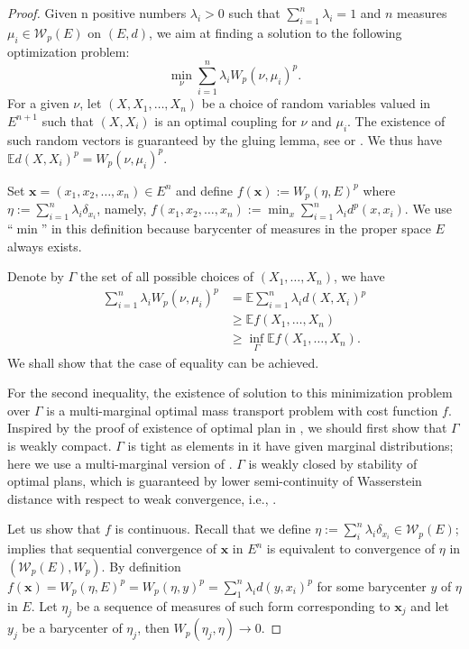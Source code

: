 \begin{proof}
	Given n positive numbers $\lambda_i > 0$ such that $\sum_{i=1}^n \lambda_i = 1$
	and $n$ measures $\mu_i \in \mathcal{W}_p(E)$ on $(E,d)$,
	we aim at finding a solution to the following optimization problem:
	\[
		\min_{\nu} \sum_{i=1}^{n}\lambda_i W_p(\nu, \mu_i)^p.
	\]
	For a given $\nu$, let $(X, X_1,\ldots,X_n)$ be a choice of random variables
	valued in $E^{n+1}$ such that
	$(X,X_i)$ is an optimal coupling for $\nu$ and $\mu_i$.
	The existence of such random vectors is guaranteed by the gluing lemma,
	see \cite[Lemma 7.6]{villani2003topics} or \cite[Lemma 5.3.4]{ambrosio2005gradient}.
	We thus have $\mathbb{E}d(X,X_i)^p = W_p(\nu, \mu_i)^p$.

	Set $\boldsymbol{x}=(x_1, x_2, \ldots, x_n) \in E^n$ and define $f(\boldsymbol{x}):= W_p(\eta, E)^p$
	where $\eta := \sum_{i=1}^{n} \lambda_i \delta_{x_i}$,
	namely, $f(x_1, x_2, \ldots, x_n) := \min_{x} \sum_{i=1}^n \lambda_i d^p(x, x_i)$.
	We use ``$\min$'' in this definition because barycenter of measures in the proper space $E$ always exists.

	Denote by $\Gamma$ the set of all possible choices of $(X_1, \ldots, X_n)$, we have
	\begin{align*}
		\sum_{i=1}^{n}\lambda_i W_p(\nu, \mu_i)^p & = \mathbb{E} \sum_{i=1}^{n}\lambda_i d(X,X_i)^p  \\
		                                          & \geq \mathbb{E} f(X_1, \ldots, X_n)              \\
		                                          & \geq \inf_\Gamma \mathbb{E} f(X_1, \ldots, X_n).
	\end{align*}
	We shall show that the case of equality can be achieved.

	For the second inequality, the existence of solution to this minimization problem over $\Gamma$
	is a multi-marginal optimal mass transport problem with cost function $f$.
	Inspired by the proof of existence of optimal plan in ,
	we should first show that $\Gamma$ is weakly compact.
	$\Gamma$ is tight as elements in it have given marginal distributions;
	here we use a multi-marginal version of .
	$\Gamma$ is weakly closed by stability of optimal plans,
	which is guaranteed by lower semi-continuity of
	Wasserstein distance with respect to weak convergence,
	i.e., .

	Let us show that $f$ is continuous.
	Recall that we define $\eta := \sum_i^{n}\lambda_i \delta_{x_i} \in \mathcal{W}_p(E)$;
	 implies that
	sequential convergence of $\boldsymbol{x}$ in $E^n$
	is equivalent to convergence of $\eta$ in $(\mathcal{W}_p(E), W_p)$.
	By definition $f(\boldsymbol{x}) = W_p(\eta, E)^p=W_p(\eta, y)^p = \sum_{1}^{n} \lambda_i d(y, x_i)^p$
	for some barycenter $y$ of $\eta$ in $E$.
	Let $\eta_j$ be a sequence of measures of such form corresponding to $\boldsymbol{x}_j$ and
	let $y_j$ be a barycenter of $\eta_j$,
	then $W_p(\eta_j , \eta) \rightarrow 0$.


\end{proof}
